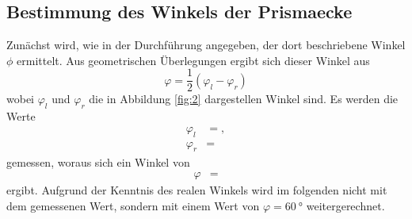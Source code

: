 
\subsection{Bestimmung des Winkels der Prismaecke}
Zunächst wird, wie in der Durchführung angegeben, der dort beschriebene Winkel $\phi$ ermittelt.
Aus geometrischen Überlegungen ergibt sich dieser Winkel aus
\begin{equation}
  \varphi = \frac{1}{2} ( \varphi_l - \varphi_r)
\end{equation}
wobei $\varphi_l$ und $\varphi_r$ die in Abbildung \ref{fig:2} dargestellen Winkel sind.
Es werden die Werte
\begin{align*}
  \varphi_l &= ,\\
  \varphi_r &= 
\end{align*}
gemessen, woraus sich ein Winkel von
\begin{align*}
  \varphi &= 
\end{align*}
ergibt.
Aufgrund der Kenntnis des realen Winkels wird im folgenden nicht mit dem gemessenen Wert, sondern mit einem Wert von $\varphi = \SI{60}{\degree}$ weitergerechnet.

